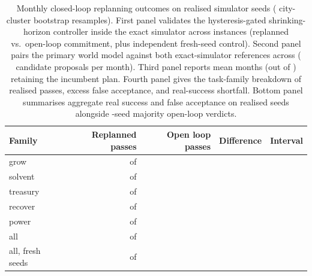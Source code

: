 \ifRpOn
\begin{table}[tbp]
\caption{Monthly closed-loop replanning outcomes on realised simulator seeds (\RpBoot{} city-cluster bootstrap resamples). First panel validates the hysteresis-gated shrinking-horizon controller inside the exact simulator across \RpCtlN{} instances (replanned vs.\ open-loop commitment, plus independent fresh-seed control). Second panel pairs the primary \SizeM{} world model against both exact-simulator references across \RpScope{} (\RpPlans{} candidate proposals per month). Third panel reports mean months (out of \RpKeptOf{}) retaining the incumbent plan. Fourth panel gives the task-family breakdown of realised passes, excess false acceptance, and real-success shortfall. Bottom panel summarises aggregate real success and false acceptance on realised seeds alongside \OracleSeeds-seed majority open-loop verdicts.}
\label{tab:replan}
\centering\scriptsize\setlength{\tabcolsep}{2.5pt}\renewcommand{\ci}[1]{#1}
\begin{tabular*}{\textwidth}{@{\extracolsep{\fill}}lrrrl@{}}
\toprule
Family & Replanned passes & Open loop passes & Difference & Interval \\
\midrule
grow & \RpCtlGrowReplan{} of \RpCtlGrowN{} & \RpCtlGrowOpen{} & \RpCtlGrowDiff{} & \RpCtlGrowDiffCI{} \\
solvent & \RpCtlSolvReplan{} of \RpCtlSolvN{} & \RpCtlSolvOpen{} & \RpCtlSolvDiff{} & \RpCtlSolvDiffCI{} \\
treasury & \RpCtlTreasReplan{} of \RpCtlTreasN{} & \RpCtlTreasOpen{} & \RpCtlTreasDiff{} & \RpCtlTreasDiffCI{} \\
recover & \RpCtlRecovReplan{} of \RpCtlRecovN{} & \RpCtlRecovOpen{} & \RpCtlRecovDiff{} & \RpCtlRecovDiffCI{} \\
power & \RpCtlPowerReplan{} of \RpCtlPowerN{} & \RpCtlPowerOpen{} & \RpCtlPowerDiff{} & \RpCtlPowerDiffCI{} \\
\midrule
all & \RpCtlReplan{} of \RpCtlN{} & \RpCtlOpen{} & \RpCtlDiff{} & \RpCtlDiffCI{} \\
all, fresh seeds & \RpFCtlReplan{} of \RpFCtlN{} & \RpFCtlOpen{} & \RpFCtlDiff{} & \RpFCtlDiffCI{} \\
\bottomrule
\end{tabular*}


\end{table}
